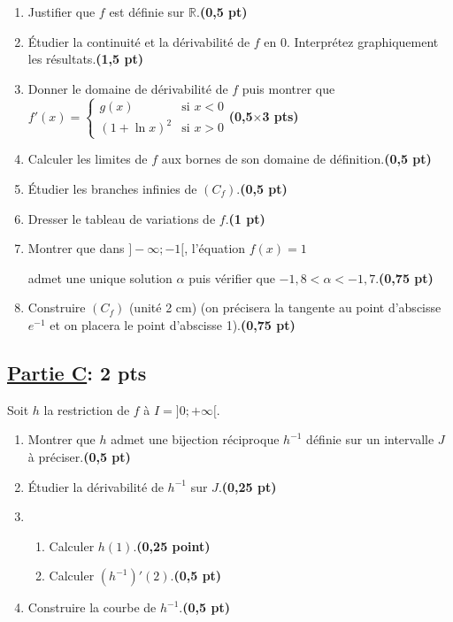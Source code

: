 \documentclass[12pt,a4paper]{article}
\begin{document}
\begin{enumerate}
    \item Justifier que \( f \) est définie sur \( \mathbb{R} \).\hfill \textbf{(0,5 pt)}
    \item Étudier la continuité et la dérivabilité de \( f \) en 0. Interprétez graphiquement les résultats.\hfill \textbf{(1,5 pt)}
    \item Donner le domaine de dérivabilité de \( f \) puis montrer que
          \(
              f'(x) =
              \begin{cases}
                  g(x)          & \text{si } x < 0 \\
                  (1 + \ln x)^2 & \text{si } x > 0
              \end{cases}
          \)\hfill \textbf{(0,5$\times$3 pts)}
    \item Calculer les limites de \( f \) aux bornes de son domaine de définition.\hfill \textbf{(0,5 pt)}
    \item Étudier les branches infinies de \( (C_f) \).\hfill \textbf{(0,5 pt)}
    \item Dresser le tableau de variations de \( f \).\hfill \textbf{(1 pt)}
    \item Montrer que dans \( ]-\infty; -1[ \), l’équation \( f(x) = 1 \)

          admet une unique solution \( \alpha \) puis vérifier que \(-1,8 < \alpha < -1,7\).\hfill \textbf{(0,75 pt)}
    \item Construire \( (C_f) \) (unité 2 cm) (on précisera la tangente au point d’abscisse \( e^{-1} \) et on placera le point d’abscisse 1).\hfill \textbf{(0,75 pt)}
\end{enumerate}

\subsection*{\underline{\textbf{Partie C}}:\textbf{ 2 pts}}

Soit \( h \) la restriction de \( f \) à \( I =]0; +\infty[ \).

    \begin{enumerate}
        \item Montrer que \( h \) admet une bijection réciproque \( h^{-1} \) définie sur un intervalle \( J \) à préciser.\hfill \textbf{(0,5 pt)}
        \item Étudier la dérivabilité de \( h^{-1} \) sur \( J \).\hfill \textbf{(0,25 pt)}
        \item
              \begin{enumerate}
                  \item Calculer \( h(1) \).\hfill \textbf{(0,25 point)}
                  \item Calculer \( (h^{-1})'(2) \).\hfill \textbf{(0,5 pt)}
              \end{enumerate}
        \item Construire la courbe de \( h^{-1} \).\hfill \textbf{(0,5 pt)}
    \end{enumerate}
\end{document}
